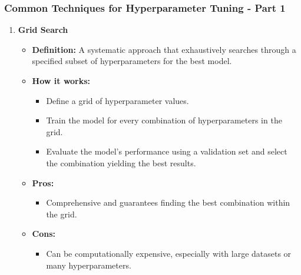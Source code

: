 \documentclass[aspectratio=169]{beamer}
\begin{document}
\begin{frame}[fragile]
    \frametitle{Common Techniques for Hyperparameter Tuning - Part 1}
    \begin{enumerate}
        \item \textbf{Grid Search}
        \begin{itemize}
            \item \textbf{Definition:} A systematic approach that exhaustively searches through a specified subset of hyperparameters for the best model.
            \item \textbf{How it works:} 
            \begin{itemize}
                \item Define a grid of hyperparameter values.
                \item Train the model for every combination of hyperparameters in the grid.
                \item Evaluate the model's performance using a validation set and select the combination yielding the best results.
            \end{itemize}
            \item \textbf{Pros:}
            \begin{itemize}
                \item Comprehensive and guarantees finding the best combination within the grid.
            \end{itemize}
            \item \textbf{Cons:}
            \begin{itemize}
                \item Can be computationally expensive, especially with large datasets or many hyperparameters.
            \end{itemize}
        \end{itemize}
    \end{enumerate}
\end{frame}
\end{document}
